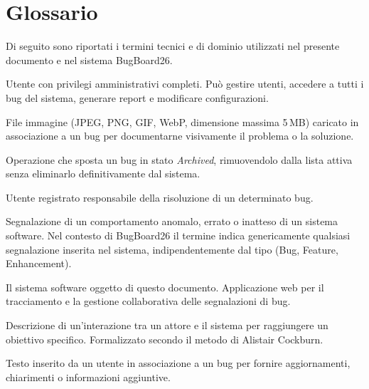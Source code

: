 
\section{Glossario}

Di seguito sono riportati i termini tecnici e di dominio utilizzati nel presente documento e nel sistema BugBoard26.

\begin{description}[style=nextline, leftmargin=3cm, labelwidth=2.8cm]

    \item[Admin]
    Utente con privilegi amministrativi completi. Può gestire utenti, accedere a tutti i bug del sistema, generare report e modificare configurazioni.

    \item[Allegato]
    File immagine (JPEG, PNG, GIF, WebP, dimensione massima 5\,MB) caricato in associazione a un bug per documentarne visivamente il problema o la soluzione.

    \item[Archiviazione]
    Operazione che sposta un bug in stato \textit{Archived}, rimuovendolo dalla lista attiva senza eliminarlo definitivamente dal sistema.

    \item[Assegnatario]
    Utente registrato responsabile della risoluzione di un determinato bug.

    \item[Bug]
    Segnalazione di un comportamento anomalo, errato o inatteso di un sistema software. Nel contesto di BugBoard26 il termine indica genericamente qualsiasi segnalazione inserita nel sistema, indipendentemente dal tipo (Bug, Feature, Enhancement).

    \item[BugBoard26]
    Il sistema software oggetto di questo documento. Applicazione web per il tracciamento e la gestione collaborativa delle segnalazioni di bug.

    \item[Caso d'uso]
    Descrizione di un'interazione tra un attore e il sistema per raggiungere un obiettivo specifico. Formalizzato secondo il metodo di Alistair Cockburn.

    \item[Commento]
    Testo inserito da un utente in associazione a un bug per fornire aggiornamenti, chiarimenti o informazioni aggiuntive.


\end{description}
